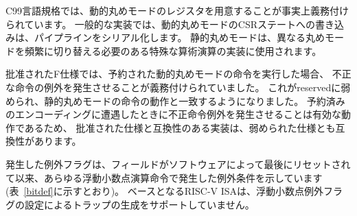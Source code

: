 \begin{commentary}
\begin{comment}
The C99 language standard effectively mandates the provision of a
dynamic rounding mode register.  In typical implementations, writes to
the dynamic rounding mode CSR state will serialize the pipeline.
Static rounding modes are used to implement specialized arithmetic
operations that often have to switch frequently between different
rounding modes.
\end{comment}

C99言語規格では、動的丸めモードのレジスタを用意することが事実上義務付けられています。 
一般的な実装では、動的丸めモードのCSRステートへの書き込みは、パイプラインをシリアル化します。
静的丸めモードは、異なる丸めモードを頻繁に切り替える必要のある特殊な算術演算の実装に使用されます。

\begin{comment}
The ratified version of the F spec mandated that an illegal
instruction exception was raised when an instruction was executed with
a reserved dynamic rounding mode.  This has been weakened to reserved,
which matches the behavior of static rounding-mode instructions.
Raising an illegal instruction exception is still valid behavior when
encountering a reserved encoding, so implementations compatible with
the ratified spec are compatible with the weakened spec.
\end{comment}

批准されたF仕様では、予約された動的丸めモードの命令を実行した場合、
不正な命令の例外を発生させることが義務付けられていました。 
これがreservedに弱められ、静的丸めモードの命令の動作と一致するようになりました。
予約済みのエンコーディングに遭遇したときに不正命令例外を発生させることは有効な動作であるため、
批准された仕様と互換性のある実装は、弱められた仕様とも互換性があります。
\end{commentary}
 
\begin{comment}
The accrued exception flags indicate the exception conditions that
have arisen on any floating-point arithmetic instruction since the
field was last reset by software, as shown in Table~\ref{bitdef}.
The base RISC-V ISA
does not support generating a trap on the setting of a floating-point
exception flag.
\end{comment}

発生した例外フラグは、フィールドがソフトウェアによって最後にリセットされて以来、あらゆる浮動小数点演算命令で発生した例外条件を示しています(表~\ref{bitdef}に示すとおり)。
ベースとなるRISC-V ISAは、浮動小数点例外フラグの設定によるトラップの生成をサポートしていません。


